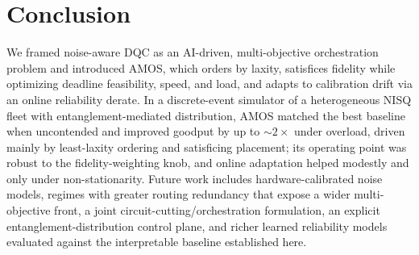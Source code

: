 \documentclass[conference]{IEEEtran}
\begin{document}
\section{Conclusion}
\label{sec:conclusion}
We framed noise-aware DQC as an AI-driven, multi-objective orchestration problem
and introduced AMOS, which orders by laxity, satisfices fidelity while optimizing
deadline feasibility, speed, and load, and adapts to calibration drift via an
online reliability derate. In a discrete-event simulator of a heterogeneous NISQ
fleet with entanglement-mediated distribution, AMOS matched the best baseline when
uncontended and improved goodput by up to $\sim\!2\times$ under overload, driven
mainly by least-laxity ordering and satisficing placement; its operating point was
robust to the fidelity-weighting knob, and online adaptation helped modestly and
only under non-stationarity. Future work includes hardware-calibrated noise
models, regimes with greater routing redundancy that expose a wider
multi-objective front, a joint circuit-cutting/orchestration formulation, an
explicit entanglement-distribution control plane, and richer learned reliability
models evaluated against the interpretable baseline established here.
\end{document}
